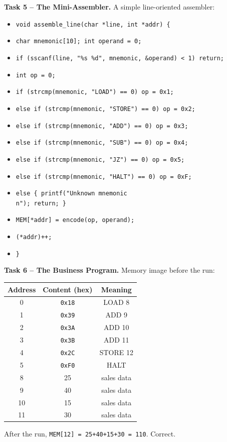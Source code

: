 \documentclass[11pt]{article}
\begin{document}
\textbf{Task 5 -- The Mini-Assembler.}
A simple line-oriented assembler:
\begin{itemize}
\item \texttt{void assemble\_line(char *line, int *addr) \{}
\item \texttt{\quad char mnemonic[10]; int operand = 0;}
\item \texttt{\quad if (sscanf(line, "\%s \%d", mnemonic, \&operand) < 1) return;}
\item \texttt{\quad int op = 0;}
\item \texttt{\quad if (strcmp(mnemonic, "LOAD") == 0) op = 0x1;}
\item \texttt{\quad else if (strcmp(mnemonic, "STORE") == 0) op = 0x2;}
\item \texttt{\quad else if (strcmp(mnemonic, "ADD") == 0) op = 0x3;}
\item \texttt{\quad else if (strcmp(mnemonic, "SUB") == 0) op = 0x4;}
\item \texttt{\quad else if (strcmp(mnemonic, "JZ") == 0) op = 0x5;}
\item \texttt{\quad else if (strcmp(mnemonic, "HALT") == 0) op = 0xF;}
\item \texttt{\quad else \{ printf("Unknown mnemonic\\n"); return; \}}
\item \texttt{\quad MEM[*addr] = encode(op, operand);}
\item \texttt{\quad (*addr)++;}
\item \texttt{\}}
\end{itemize}

\textbf{Task 6 -- The Business Program.}
Memory image before the run:

\begin{center}
\begin{tabular}{|c|c|c|}
\hline
\rowcolor{popblueL} \textbf{Address} & \textbf{Content (hex)} & \textbf{Meaning} \\
\hline
0 & \texttt{0x18} & LOAD 8 \\
1 & \texttt{0x39} & ADD 9 \\
2 & \texttt{0x3A} & ADD 10 \\
3 & \texttt{0x3B} & ADD 11 \\
4 & \texttt{0x2C} & STORE 12 \\
5 & \texttt{0xF0} & HALT \\
8 & 25 & sales data \\
9 & 40 & sales data \\
10 & 15 & sales data \\
11 & 30 & sales data \\
\hline
\end{tabular}
\end{center}
After the run, \texttt{MEM[12] = 25+40+15+30 = 110}. Correct.
\end{document}
